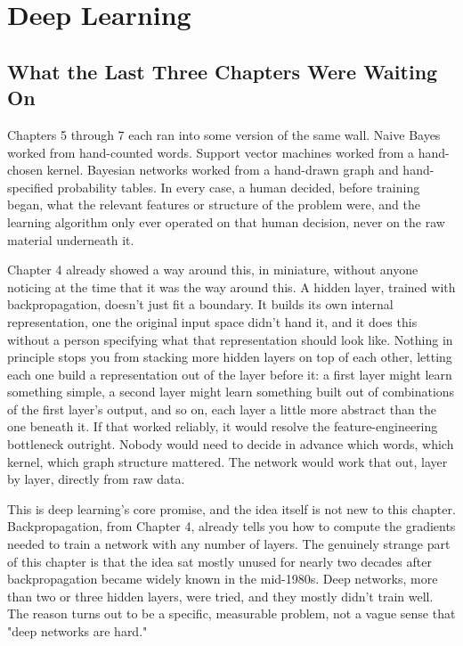 \chapter{Deep Learning}

\section*{What the Last Three Chapters Were Waiting On}

Chapters 5 through 7 each ran into some version of the same wall. Naive Bayes worked from hand-counted words. Support vector machines worked from a hand-chosen kernel. Bayesian networks worked from a hand-drawn graph and hand-specified probability tables. In every case, a human decided, before training began, what the relevant features or structure of the problem were, and the learning algorithm only ever operated on that human decision, never on the raw material underneath it.

Chapter 4 already showed a way around this, in miniature, without anyone noticing at the time that it was the way around this. A hidden layer, trained with backpropagation, doesn't just fit a boundary. It builds its own internal representation, one the original input space didn't hand it, and it does this without a person specifying what that representation should look like. Nothing in principle stops you from stacking more hidden layers on top of each other, letting each one build a representation out of the layer before it: a first layer might learn something simple, a second layer might learn something built out of combinations of the first layer's output, and so on, each layer a little more abstract than the one beneath it. If that worked reliably, it would resolve the feature-engineering bottleneck outright. Nobody would need to decide in advance which words, which kernel, which graph structure mattered. The network would work that out, layer by layer, directly from raw data.

This is deep learning's core promise, and the idea itself is not new to this chapter. Backpropagation, from Chapter 4, already tells you how to compute the gradients needed to train a network with any number of layers. The genuinely strange part of this chapter is that the idea sat mostly unused for nearly two decades after backpropagation became widely known in the mid-1980s. Deep networks, more than two or three hidden layers, were tried, and they mostly didn't train well. The reason turns out to be a specific, measurable problem, not a vague sense that "deep networks are hard."

